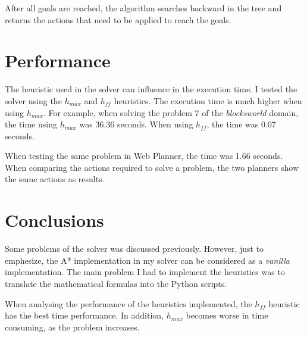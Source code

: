 \documentclass[letterpaper]{article}
\begin{document}
After all goals are reached, the algorithm searches backward in the tree and returns the actions that need to be applied to reach the goals.


\section{Performance}

The heuristic used in the solver can influence in the execution time. I tested the solver using the $h_{max}$ and $h_{ff}$ heuristics. The execution time is much higher when using $h_{max}$. For example, when solving the problem 7 of the \textit{blocksworld} domain, the time using $h_{max}$ was 36.36 seconds. When using $h_{ff}$, the time was 0.07 seconds.

When testing the same problem in Web Planner, the time was 1.66 seconds. When comparing the actions required to solve a problem, the two planners show the same actions as results.


\section{Conclusions}

Some problems of the solver was discussed previously. However, just to emphesize, the A* implementation in my solver can be considered as a \textit{vanilla} implementation. The main problem I had to implement the heuristics was to translate the mathematical formulas into the Python scripts.

When analysing the performance of the heuristics implemented, the $h_{ff}$ heuristic has the best time performance. In addition, $h_{max}$ becomes worse in time consuming, as the problem increases.
\end{document}
